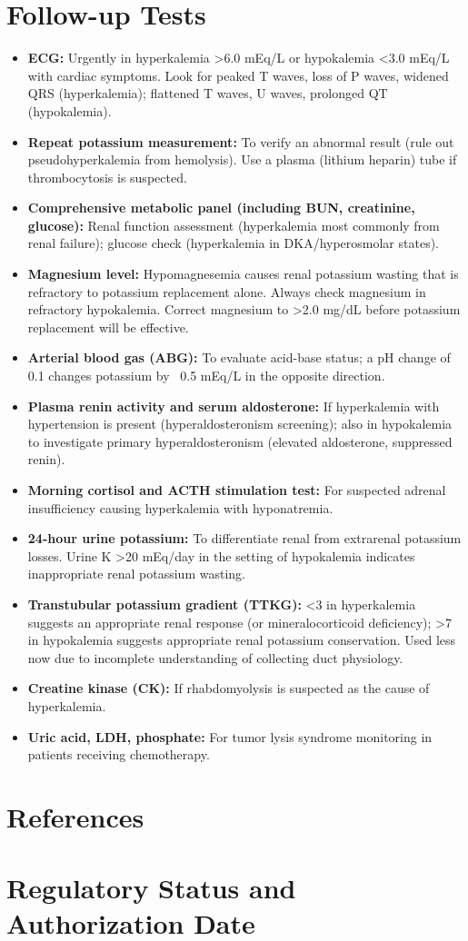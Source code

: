 \section*{Follow-up Tests}
\begin{itemize}
  \item \textbf{ECG:} Urgently in hyperkalemia >6.0 mEq/L or hypokalemia <3.0 mEq/L with cardiac symptoms. Look for peaked T waves, loss of P waves, widened QRS (hyperkalemia); flattened T waves, U waves, prolonged QT (hypokalemia).
  \item \textbf{Repeat potassium measurement:} To verify an abnormal result (rule out pseudohyperkalemia from hemolysis). Use a plasma (lithium heparin) tube if thrombocytosis is suspected.
  \item \textbf{Comprehensive metabolic panel (including BUN, creatinine, glucose):} Renal function assessment (hyperkalemia most commonly from renal failure); glucose check (hyperkalemia in DKA/hyperosmolar states).
  \item \textbf{Magnesium level:} Hypomagnesemia causes renal potassium wasting that is refractory to potassium replacement alone. Always check magnesium in refractory hypokalemia. Correct magnesium to >2.0 mg/dL before potassium replacement will be effective.
  \item \textbf{Arterial blood gas (ABG):} To evaluate acid-base status; a pH change of 0.1 changes potassium by ~0.5 mEq/L in the opposite direction.
  \item \textbf{Plasma renin activity and serum aldosterone:} If hyperkalemia with hypertension is present (hyperaldosteronism screening); also in hypokalemia to investigate primary hyperaldosteronism (elevated aldosterone, suppressed renin).
  \item \textbf{Morning cortisol and ACTH stimulation test:} For suspected adrenal insufficiency causing hyperkalemia with hyponatremia.
  \item \textbf{24-hour urine potassium:} To differentiate renal from extrarenal potassium losses. Urine K >20 mEq/day in the setting of hypokalemia indicates inappropriate renal potassium wasting.
  \item \textbf{Transtubular potassium gradient (TTKG):} <3 in hyperkalemia suggests an appropriate renal response (or mineralocorticoid deficiency); >7 in hypokalemia suggests appropriate renal potassium conservation. Used less now due to incomplete understanding of collecting duct physiology.
  \item \textbf{Creatine kinase (CK):} If rhabdomyolysis is suspected as the cause of hyperkalemia.
  \item \textbf{Uric acid, LDH, phosphate:} For tumor lysis syndrome monitoring in patients receiving chemotherapy.
\end{itemize}

\section*{References}



\clearpage
\section*{Regulatory Status and Authorization Date}

\clearpage
